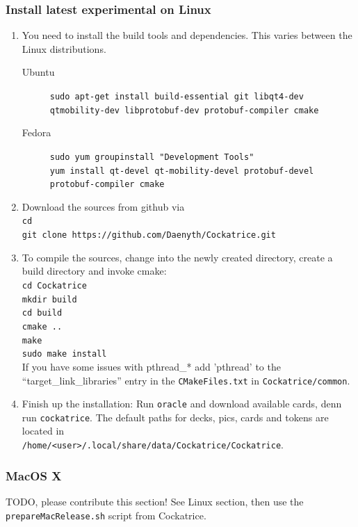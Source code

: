 \documentclass[a4paper]{scrbook}
\newcommand{\shellcmd}[1]{\texttt{\scriptsize #1}}
\begin{document}
\subsubsection{Install latest experimental on Linux}
\begin{enumerate}
 \item You need to install the build tools and dependencies. This varies between the Linux distributions.
 \begin{description}
  \item[Ubuntu] \shellcmd{sudo apt-get install build-essential git libqt4-dev qtmobility-dev libprotobuf-dev protobuf-compiler cmake}
  \item[Fedora] \shellcmd{sudo yum groupinstall "Development Tools"\\
  yum install qt-devel qt-mobility-devel protobuf-devel protobuf-compiler cmake}
 \end{description}
 \item Download the sources from github via \\ \shellcmd{cd\\ git clone https://github.com/Daenyth/Cockatrice.git}
 \item To compile the sources, change into the newly created directory, create a build directory and invoke cmake:\\
 \shellcmd{cd Cockatrice \\
mkdir build \\
cd build \\
cmake ..\\
make\\
sudo make install
}\\
If you have some issues with pthread\_* add 'pthread' to the ``target\_link\_libraries'' entry in the \shellcmd{CMakeFiles.txt} in \shellcmd{Cockatrice/common}.

 \item Finish up the installation: Run \shellcmd{oracle} and download available cards, denn run \shellcmd{cockatrice}.
The default paths for decks, pics, cards and tokens are located in \\ \shellcmd{/home/<user>/.local/share/data/Cockatrice/Cockatrice}.
\end{enumerate}

\subsubsection{MacOS X}
TODO, please contribute this section! See Linux section, then use the \shellcmd{prepareMacRelease.sh} script from Cockatrice.
\end{document}
